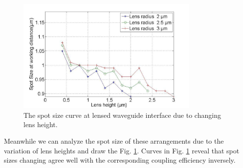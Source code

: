 \begin{figure}[!ht]
\centering
\includegraphics[width=0.8\textwidth]{bilder/spot_fix_lens_radium_hxx}
\caption{The spot size curve at lensed waveguide interface due to changing lens height.}
\label{fig:lensed_guide_spot_size_curve}
\end{figure} 
Meanwhile we can analyze the spot size of these arrangements due to the variation of lens heights and draw the Fig. \ref{fig:lensed_guide_spot_size_curve}. Curves in Fig. \ref{fig:lensed_guide_spot_size_curve} reveal that spot sizes changing agree well with the corresponding coupling efficiency inversely.

